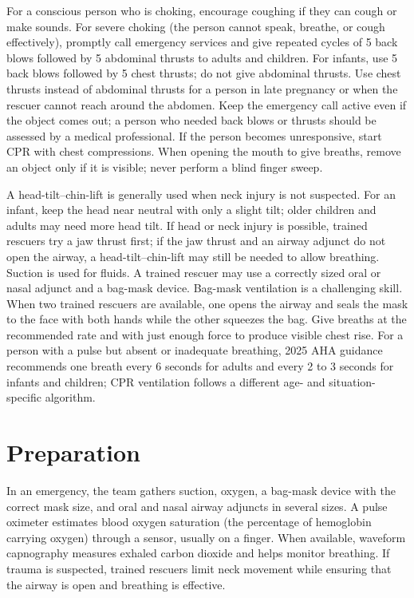 For a conscious person who is choking, encourage coughing if they can cough or make sounds. For severe choking (the person cannot speak, breathe, or cough effectively), promptly call emergency services and give repeated cycles of 5 back blows followed by 5 abdominal thrusts to adults and children. For infants, use 5 back blows followed by 5 chest thrusts; do not give abdominal thrusts. Use chest thrusts instead of abdominal thrusts for a person in late pregnancy or when the rescuer cannot reach around the abdomen. Keep the emergency call active even if the object comes out; a person who needed back blows or thrusts should be assessed by a medical professional. If the person becomes unresponsive, start CPR with chest compressions. When opening the mouth to give breaths, remove an object only if it is visible; never perform a blind finger sweep.

A head-tilt--chin-lift is generally used when neck injury is not suspected. For an infant, keep the head near neutral with only a slight tilt; older children and adults may need more head tilt. If head or neck injury is possible, trained rescuers try a jaw thrust first; if the jaw thrust and an airway adjunct do not open the airway, a head-tilt--chin-lift may still be needed to allow breathing. Suction is used for fluids. A trained rescuer may use a correctly sized oral or nasal adjunct and a bag-mask device. Bag-mask ventilation is a challenging skill. When two trained rescuers are available, one opens the airway and seals the mask to the face with both hands while the other squeezes the bag. Give breaths at the recommended rate and with just enough force to produce visible chest rise. For a person with a pulse but absent or inadequate breathing, 2025 AHA guidance recommends one breath every 6 seconds for adults and every 2 to 3 seconds for infants and children; CPR ventilation follows a different age- and situation-specific algorithm.
\section*{Preparation}
In an emergency, the team gathers suction, oxygen, a bag-mask device with the correct mask size, and oral and nasal airway adjuncts in several sizes. A pulse oximeter estimates blood oxygen saturation (the percentage of hemoglobin carrying oxygen) through a sensor, usually on a finger. When available, waveform capnography measures exhaled carbon dioxide and helps monitor breathing. If trauma is suspected, trained rescuers limit neck movement while ensuring that the airway is open and breathing is effective.
